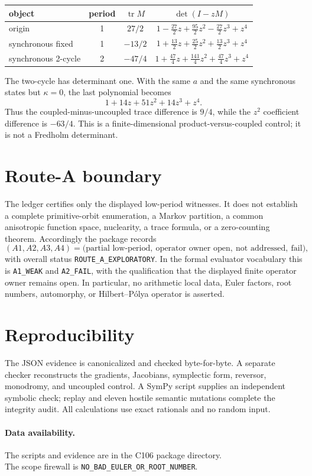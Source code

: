 \documentclass[10pt]{article}
\newcommand{\tr}{\operatorname{tr}}
\begin{document}
\begin{center}
\small
\begin{tabular}{lccc}
\toprule
object & period & $\tr M$ & $\det(I-zM)$ \\
\midrule
origin & 1 & $27/2$ & $1-\frac{27}{2}z+\frac{95}{2}z^2-\frac{27}{2}z^3+z^4$ \\
synchronous fixed & 1 & $-13/2$ & $1+\frac{13}{2}z+\frac{25}{2}z^2+\frac{13}{2}z^3+z^4$ \\
synchronous 2-cycle & 2 & $-47/4$ & $1+\frac{47}{4}z+\frac{141}{4}z^2+\frac{47}{4}z^3+z^4$ \\
\bottomrule
\end{tabular}
\end{center}

The two-cycle has determinant one.  With the same $a$ and the same synchronous states but $\kappa=0$, the last polynomial becomes
\[
 1+14z+51z^2+14z^3+z^4.
\]
Thus the coupled-minus-uncoupled trace difference is $9/4$, while the $z^2$ coefficient difference is $-63/4$.  This is a finite-dimensional product-versus-coupled control; it is not a Fredholm determinant.

\section{Route-A boundary}
The ledger certifies only the displayed low-period witnesses.  It does not establish a complete primitive-orbit enumeration, a Markov partition, a common anisotropic function space, nuclearity, a trace formula, or a zero-counting theorem.  Accordingly the package records
\[
 (A1,A2,A3,A4)=\bigl(\text{partial low-period},\ \text{operator owner open},\ \text{not addressed},\ \text{fail}\bigr),
\]
with overall status \texttt{ROUTE\_A\_EXPLORATORY}.  In the formal evaluator vocabulary this is \texttt{A1\_WEAK} and \texttt{A2\_FAIL}, with the qualification that the displayed finite operator owner remains open.  In particular, no arithmetic local data, Euler factors, root numbers, automorphy, or Hilbert--P\'olya operator is asserted.

\section{Reproducibility}
The JSON evidence is canonicalized and checked byte-for-byte.  A separate checker reconstructs the gradients, Jacobians, symplectic form, reversor, monodromy, and uncoupled control.  A SymPy script supplies an independent symbolic check; replay and eleven hostile semantic mutations complete the integrity audit.  All calculations use exact rationals and no random input.

\paragraph{Data availability.} The scripts and evidence are in the C106 package directory.\\
The scope firewall is \texttt{NO\_BAD\_EULER\_OR\_ROOT\_NUMBER}.
\end{document}
